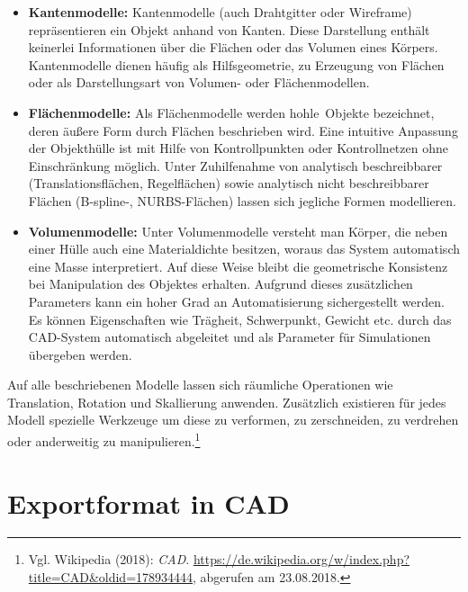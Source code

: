 \begin{itemize}
\item \textbf{Kantenmodelle:} Kantenmodelle (auch Drahtgitter oder Wireframe) repräsentieren ein Objekt anhand von Kanten. Diese Darstellung enthält keinerlei Informationen über die Flächen oder das Volumen eines Körpers. Kantenmodelle dienen häufig als Hilfsgeometrie, zu Erzeugung von Flächen oder als Darstellungsart von Volumen- oder Flächenmodellen.

\item \textbf{Flächenmodelle:} Als Flächenmodelle werden \glqq hohle\grqq\ Objekte bezeichnet, deren äußere Form durch Flächen beschrieben wird. Eine intuitive Anpassung der Objekthülle ist mit Hilfe von Kontrollpunkten oder Kontrollnetzen ohne Einschränkung möglich. Unter Zuhilfenahme von analytisch beschreibbarer (Translationsflächen, Regelflächen) sowie analytisch nicht beschreibbarer Flächen (B-spline-, NURBS-Flächen) lassen sich jegliche Formen modellieren.

\item \textbf{Volumenmodelle:} Unter Volumenmodelle versteht man Körper, die neben einer Hülle auch eine Materialdichte besitzen, woraus das System automatisch eine Masse interpretiert. Auf diese Weise bleibt die geometrische Konsistenz bei Manipulation des Objektes erhalten. Aufgrund dieses zusätzlichen Parameters kann ein hoher Grad an Automatisierung sichergestellt werden. Es können Eigenschaften wie Trägheit, Schwerpunkt, Gewicht etc. durch das CAD-System automatisch abgeleitet und als Parameter für Simulationen übergeben werden.  
\end{itemize}

Auf alle beschriebenen Modelle lassen sich räumliche Operationen wie Translation, Rotation und Skallierung anwenden. Zusätzlich existieren für jedes Modell spezielle Werkzeuge um diese zu verformen, zu zerschneiden, zu verdrehen oder anderweitig zu manipulieren.\footnote{Vgl. Wikipedia  (2018): \textit{CAD}.\newline
\url{https://de.wikipedia.org/w/index.php?title=CAD&oldid=178934444},\newline 
abgerufen am 23.08.2018.} 

\section{Exportformat in CAD}
\label{sec:ExportformatInCAD}


